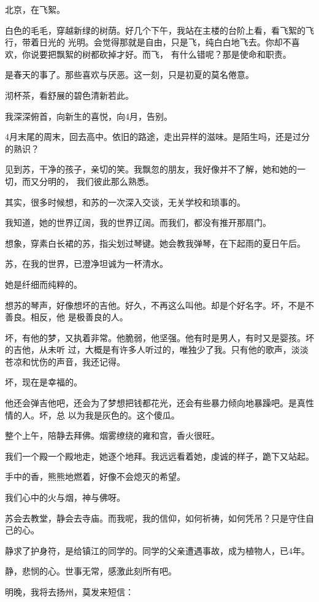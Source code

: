 		北京，在飞絮。

		白色的毛毛，穿越新绿的树荫。好几个下午，我站在主楼的台阶上看，看飞絮的飞行，带着日光的
	光明。会觉得那就是自由，只是飞，纯白白地飞去。你却不喜欢，你说要把飘絮的树都砍掉才好。而飞，
	有什么错呢？那是使命和职责。

		是春天的事了。那些喜欢与厌恶。这一刻，只是初夏的莫名倦意。

		沏杯茶，看舒展的碧色清新若此。

		我深深俯首，向新生的喜悦，向4月，告别。

		4月末尾的周末，回去高中。依旧的路途，走出异样的滋味。是陌生吗，还是过分的熟识？

		见到苏，干净的孩子，亲切的笑。我飘忽的朋友，我好像并不了解，她和她的一切，而又分明的，
	我们彼此那么熟悉。

		其实，很多时候想，和苏的一次深入交谈，无关学校和琐事的。

		我知道，她的世界辽阔，我的世界辽阔。而我们，都没有推开那扇门。

		想象，穿素白长裙的苏，指尖划过琴键。她会教我弹琴，在下起雨的夏日午后。

		苏，在我的世界，已澄净坦诚为一杯清水。

		她是纤细而纯粹的。

		想苏的琴声，好像想坏的吉他。好久，不再这么叫他。却是个好名字。坏，不是不善良。相反，他
	是极善良的人。

		坏，有他的梦，又执着非常。他脆弱，他坚强。他有时是男人，有时又是婴孩。坏的吉他，从未听
	过，大概是有许多人听过的，唯独少了我。只有他的歌声，淡淡苍凉和忧伤的声音，我还记得。

		坏，现在是幸福的。

		他还会弹吉他吧，还会为了梦想把钱都花光，还会有些暴力倾向地暴躁吧。是真性情的人。坏，总
	以为我是灰色的。这个傻瓜。

		整个上午，陪静去拜佛。烟雾缭绕的雍和宫，香火很旺。

		我们一个殿一个殿地走，她逐个地拜。我远远看着她，虔诚的样子，跪下又站起。

		手中的香，熊熊地燃着，好像不会熄灭的希望。

		我们心中的火与烟，神与佛呀。

		苏会去教堂，静会去寺庙。而我呢，我的信仰，如何祈祷，如何凭吊？只是守住自己的心。

		静求了护身符，是给镇江的同学的。同学的父亲遭遇事故，成为植物人，已4年。

		静，悲悯的心。世事无常，感激此刻所有吧。

		明晚，我将去扬州，莫发来短信：

